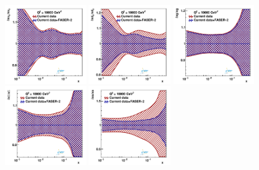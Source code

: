 \begin{figure}[t]
\centering
\includegraphics[width=0.32\textwidth]{plots/nuclear_fasernu2/inclusive+charm_chargediscrimination/statOnly_FASERv2_q2_10000_pdf_uv_ratio.pdf}
\includegraphics[width=0.32\textwidth]{plots/nuclear_fasernu2/inclusive+charm_chargediscrimination/statOnly_FASERv2_q2_10000_pdf_dv_ratio.pdf}
\includegraphics[width=0.32\textwidth]{plots/nuclear_fasernu2/inclusive+charm_chargediscrimination/statOnly_FASERv2_q2_10000_pdf_g_ratio.pdf}\\
\includegraphics[width=0.32\textwidth]{plots/nuclear_fasernu2/inclusive+charm_chargediscrimination/statOnly_FASERv2_q2_10000_pdf_Sea_ratio.pdf}
\includegraphics[width=0.32\textwidth]{plots/nuclear_fasernu2/inclusive+charm_chargediscrimination/statOnly_FASERv2_q2_10000_pdf_s_ratio.pdf}

\end{figure}
